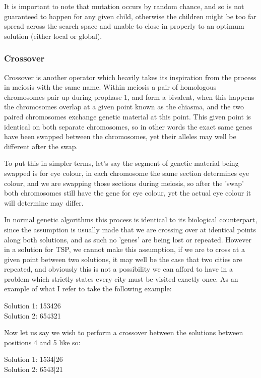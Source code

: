 \documentclass[11pt,a4paper,titlepage]{article}
\begin{document}
It is important to note that mutation occurs by random chance, and so is not guaranteed to happen for any given child, otherwise the children might be too far spread across the search space and unable to close in properly to an optimum solution (either local or global).

\subsubsection{Crossover}

Crossover is another operator which heavily takes its inspiration from the process in meiosis with the same name. Within meiosis a pair of homologous chromosomes pair up during prophase 1, and form a bivalent, when this happens the chromosomes overlap at a given point known as the chiasma, and the two paired chromosomes exchange genetic material at this point. This given point is identical on both separate chromosomes, so in other words the exact same genes have been swapped between the chromosomes, yet their alleles may well be different after the swap.

To put this in simpler terms, let's say the segment of genetic material being swapped is for eye colour, in each chromosome the same section determines eye colour, and we are swapping those sections during meiosis, so after the 'swap' both chromosomes still have the gene for eye colour, yet the actual eye colour it will determine may differ.

In normal genetic algorithms this process is identical to its biological counterpart, since the assumption is usually made that we are crossing over at identical points along both solutions, and as such no 'genes' are being lost or repeated. However in a solution for TSP, we cannot make this assumption, if we are to cross at a given point between two solutions, it may well be the case that two cities are repeated, and obviously this is not a possibility we can afford to have in a problem which strictly states every city must be visited exactly once. As an example of what I refer to take the following example:

\begin{center}\Large
Solution 1: 153426\\
Solution 2: 654321
\end{center}

Now let us say we wish to perform a crossover between the solutions between positions 4 and 5 like so:

\begin{center}\Large
Solution 1: 1534$|$26\\
Solution 2: 6543$|$21
\end{center}
\end{document}
